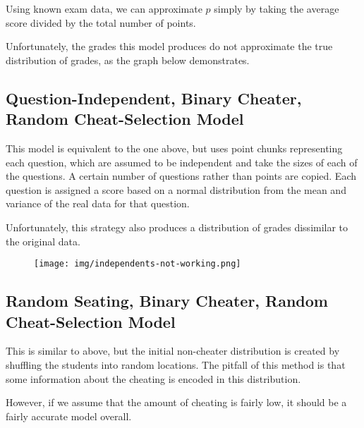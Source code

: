 \documentclass{article}
\begin{document}
        Using known exam data, we can approximate $p$ simply by taking the average score divided
            by the total number of points.

        Unfortunately, the grades this model produces do not approximate the true distribution
            of grades, as the graph below demonstrates.

    \subsection{Question-Independent, Binary Cheater, Random Cheat-Selection Model}
        This model is equivalent to the one above, but uses point chunks representing each
            question, which are assumed to be independent and take the sizes of each of the
            questions. A certain number of questions rather than points are copied. Each question
            is assigned a score based on a normal distribution from the mean and variance of
            the real data for that question.

        Unfortunately, this strategy also produces a distribution of grades dissimilar to the
            original data.

        \begin{figure}[h!]
            \centering
            \texttt{[image: img/independents-not-working.png]}
        \end{figure}
    \subsection{Random Seating, Binary Cheater, Random Cheat-Selection Model}
        This is similar to above, but the initial non-cheater distribution is created by
            shuffling the students into random locations. The pitfall of this method is that
            some information about the cheating is encoded in this distribution.

        However, if we assume that the amount of cheating is fairly low, it should be a fairly
            accurate model overall.
\end{document}
